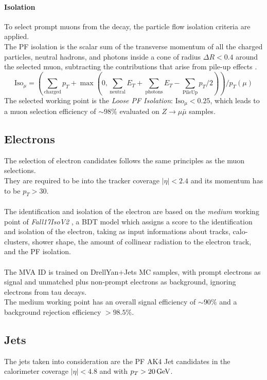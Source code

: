 \paragraph*{Isolation}
To select prompt muons from the \PW decay, the particle flow isolation criteria are applied.\\
The PF isolation is the scalar sum of the transverse momentum of all the charged particles, neutral hadrons, and  photons inside a cone of radius $\Delta R<0.4$ around the selected muon, subtracting the contributions that arise from pile-up effects \cite{2018MuonData}.
\begin{equation}
    \text{Iso}_\mu = \left(\sum_{\text{charged}} p_T+\max\left(0,\sum_{\text{neutral}}E_T+\sum_{\text{photons}}E_T-\sum_{\text{PileUp}}p_T/2\right)\right)\bigg/p_T(\mu)
\end{equation}
The selected working point is the \emph{Loose PF Isolation}: $\text{Iso}_\mu<0.25$, which leads to a muon selection efficiency of $\sim 98\%$ evaluated on $Z \to \mu \bar{\mu}$ samples.






\subsection{Electrons}
The selection of electron candidates follows the same principles as the muon selections.\\
They are required to be into the tracker coverage $|\eta|<2.4$ and its momentum has to be $p_T>30$.\\
\\
The identification and isolation of the electron are based on the \emph{medium} working point of \textit{Fall17IsoV2} \cite{2018ElectronConference}, a BDT model which assigns a score to the identification and isolation of the electron, taking as input informations about tracks, calo-clusters, shower shape, the amount of collinear radiation to the electron track, and the PF isolation.\\
\\
The MVA ID is trained on DrellYan+Jets MC samples, with prompt electrons as signal and unmatched plus non-prompt electrons as background, ignoring electrons from tau decays.\\
The medium working point has an overall signal efficiency of $\sim 90\%$ and a background rejection efficiency $>98.5\%$.

\subsection{Jets}\label{sec:jet}
The jets taken into consideration are the PF AK4 Jet candidates in the calorimeter coverage $|\eta|<4.8$ and with $p_T>20{\,\text{Ge\hspace{-.08em}V}}$.

